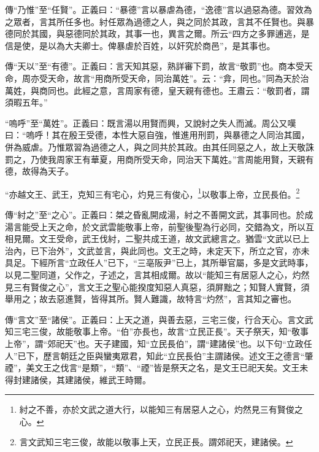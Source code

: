 {\noindent\zhuan{}\fzbyks 傳“乃惟”至“任賢”。正義曰：“暴德”言以暴虐為德，“逸德”言以過惡為德。習效為之眾者，言其所任多也。紂任眾為過德之人，與之同於其政，言其不任賢也。與暴德同於其國，與惡德同於其政，其事一也，異言之爾。所云“四方之多罪逋逃，是信是使，是以為大夫卿士。俾暴虐於百姓，以奸究於商邑”，是其事也。 \par}

{\noindent\zhuan{}\fzbyks 傳“天以”至“有德”。正義曰：言天知其惡，熟詳審下罰，故言“敬罰”也。商本受天命，周亦受天命，故言“用商所受天命，同治萬姓”。云：“弇，同也。”同為天於治萬姓，與商同也。此經之意，言周家有德，皇天親有德也。王肅云：“敬罰者，謂須暇五年。” \par}

{\noindent\shu{}\fzkt “嗚呼”至“萬姓”。正義曰：既言湯以用賢而興，又說紂之失人而滅。周公又嘆曰：“嗚呼！其在殷王受德，本性大惡自強，惟進用刑罰，與暴德之人同治其國，併為威虐。乃惟眾習為過德之人，與之同共於其政。由其任同惡之人，故上天敬誅罰之，乃使我周家王有華夏，用商所受天命，同治天下萬姓。”言周能用賢，天親有德，故得為天子。 \par}

“亦越文王、武王，克知三有宅心，灼見三有俊心，\footnote{紂之不善，亦於文武之道大行，以能知三有居惡人之心，灼然見三有賢俊之心。}以敬事上帝，立民長伯。\footnote{言文武知三宅三俊，故能以敬事上天，立民正長。謂郊祀天，建諸侯。}


{\noindent\zhuan{}\fzbyks 傳“紂之”至“之心”。正義曰：桀之昏亂開成湯，紂之不善開文武，其事同也。於成湯言能受上天之命，於文武雲能敬事上帝，前聖後聖為行必同，交錯為文，所以互相見爾。文王受命，武王伐紂，二聖共成王道，故文武總言之。猶雲“文武以已上治內，已下治外”，文武並言，與此同也。文王之時，未定天下，所立之官，亦未具足。下經所言“立政任人”已下，“三亳阪尹”已上，其所舉官屬，多是文武時事，以見二聖同道，父作之，子述之，言其相成爾。故以“能知三有居惡人之心，灼然見三有賢俊之心”，言文王之聖心能揆度知惡人真惡，須屏黜之；知賢人實賢，須舉用之；故去惡進賢，皆得其所。賢人難識，故特言“灼然”，言其知之審也。 \par}

{\noindent\zhuan{}\fzbyks 傳“言文”至“諸侯”。正義曰：上天之道，與善去惡，三宅三俊，行合天心。言文武知三宅三俊，故能敬事上帝。“伯”亦長也，故言“立民正長”。天子祭天，知“敬事上帝”，謂“郊祀天”也。天子建國，知“立民長伯”，謂“建諸侯”也。以下句“立政任人”已下，歷言朝廷之臣與蠻夷眾君，知此“立民長伯”主謂諸侯。述文王之德言“肇禋”，美文王之伐言“是類”，“類”、“禋”皆是祭天之名，是文王已祀天矣。文王未得封建諸侯，其建諸侯，維武王時爾。 \par}

